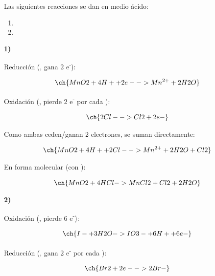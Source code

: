 \begin{exercise}
    Las siguientes reacciones se dan en medio ácido:

    \begin{enumerate}
        \item {}
        \item {}
    \end{enumerate}
    \begin{solu}

        \textbf{1) }

        Reducción (, gana 2 e\textsuperscript{-}):

        \begin{equation*}
            \ch{MnO2 + 4 H+ + 2 e- -> Mn^{2+} + 2 H2O}
        \end{equation*}

        Oxidación (, pierde 2 e\textsuperscript{-} por cada ):

        \begin{equation*}
            \ch{2 Cl- -> Cl2 + 2 e-}
        \end{equation*}

        Como ambas ceden/ganan 2 electrones, se suman directamente:

        \begin{equation*}
            \ch{MnO2 + 4 H+ + 2 Cl- -> Mn^{2+} + 2 H2O + Cl2}
        \end{equation*}

        En forma molecular (con ):

        \begin{equation*}
            \ch{MnO2 + 4 HCl -> MnCl2 + Cl2 + 2 H2O}
        \end{equation*}

        \textbf{2) }

        Oxidación (, pierde 6 e\textsuperscript{-}):

        \begin{equation*}
            \ch{I- + 3 H2O -> IO3- + 6 H+ + 6 e-}
        \end{equation*}

        Reducción (, gana 2 e\textsuperscript{-} por cada ):

        \begin{equation*}
            \ch{Br2 + 2 e- -> 2 Br-}
        \end{equation*}


\end{solu}
\end{exercise}
